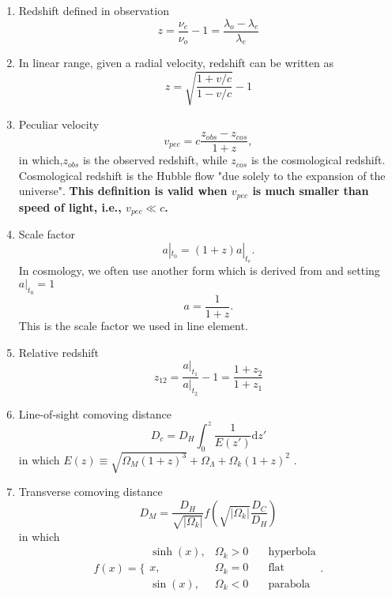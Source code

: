 \documentclass[11pt]{book}
\begin{document}
\begin{enumerate}
\item
Redshift defined in observation
\begin{equation}
	z = \frac{\nu_e}{\nu_o} -1 = \frac{\lambda_o-\lambda_e}{\lambda_e}
\end{equation}

\item
In linear range, given a radial velocity, redshift can be written as
\begin{equation}
	z = \sqrt{\frac{1 + v/c}{1 - v/c}} - 1
\end{equation}

\item
Peculiar velocity
\begin{equation}
	v_{pec} = c \frac {z_{obs} - z_{cos} }{ 1+z }  ,
\end{equation}
in which,$z_{obs}$ is the observed redshift, while $z_{cos}$ is the cosmological redshift. Cosmological redshift is the Hubble flow "due solely to the expansion of the universe".
{\bf This definition is valid when $v_{pec}$ is much smaller than speed of light, i.e., $v_{pec}\ll c$.}

\item
Scale factor
\begin{equation}
	a|_{t_0} = (1+z) a|_{t_e}  \label{eq-co-dis-scale_factor}  .
\end{equation}
In cosmology, we often use another form which is derived from \label{eq-co-dis-scale_factor} and setting $a|_{t_0}= 1$
\begin{equation}
	a = \frac 1{1+z}     .
\end{equation}
This is the scale factor we used in line element.

\item
Relative redshift
\begin{equation}
	z_{12} = \frac{a|_{t_1}}{a|_{t_2}}-1 = \frac{1+z_2}{1+z_1}
\end{equation}

\item
Line-of-sight comoving distance
\begin{equation}
	D_c = D_H\int^z_0 \frac{1}{E(z')}\mathrm dz'
\end{equation}
in which $E(z) \equiv \sqrt{\Omega_M (1+z)^3} + \Omega_\Lambda + \Omega_k (1+z)^2$    .

\item
Transverse comoving distance
\begin{equation}
D_M = \frac{D_H}{\sqrt{\left\vert\Omega_k\right\vert}} f(\sqrt{\left\vert \Omega_k \right\vert}\frac {D_C}{D_H})
\end{equation}
in which 
\begin{equation}
f(x) = \Big\{
\begin{array}{lll}
\sinh(x), & \Omega_k>0 \quad &\text{hyperbola}\\
x, & \Omega_k = 0 &\text{flat}\\
\sin(x), & \Omega_k<0 &\text{parabola}
\end{array} .
\end{equation}



\end{enumerate}
\end{document}
